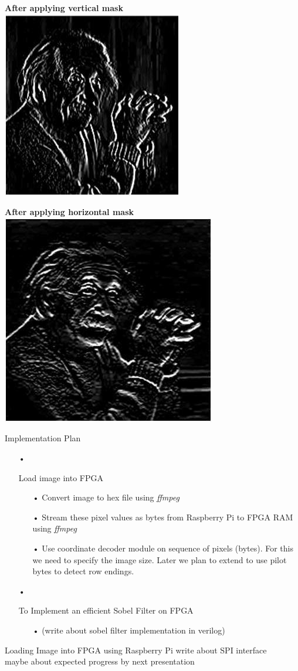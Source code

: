 \documentclass[11pt]{beamer}
\begin{document}
\begin{frame}
\textbf{After applying vertical mask}
\includegraphics{sobel2}
\end{frame}

\begin{frame}
\textbf{After applying horizontal mask}
\includegraphics{sobel3}
\end{frame}

\begin{frame}{Implementation Plan}
	\begin{itemize}
		\item[•] {Load image into FPGA
			\begin{itemize}
				\item[•] Convert image to hex file using \textit{ffmpeg}
				\item[•] Stream these pixel values as bytes from Raspberry Pi to FPGA RAM using \textit{ffmpeg}
				\item[•] Use coordinate decoder module on sequence of pixels (bytes). For this we need to specify the image size. Later we plan to extend to use pilot bytes to detect row endings. 
			\end{itemize}
		}
		\pause
		\item[•] { To Implement an efficient Sobel Filter on FPGA
			\begin{itemize}
				\item[•] (write about sobel filter implementation in verilog)
			\end{itemize}
		}
	\end{itemize}

\end{frame}

\begin{frame}{Loading Image into FPGA using Raspberry Pi}
write about SPI interface \\
maybe about expected progress by next presentation
\end{frame}
\end{document}
